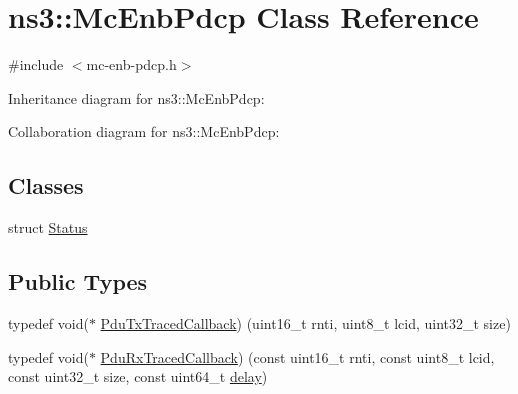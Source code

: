 \hypertarget{classns3_1_1McEnbPdcp}{}\section{ns3\+:\+:Mc\+Enb\+Pdcp Class Reference}
\label{classns3_1_1McEnbPdcp}


{\ttfamily \#include $<$mc-\/enb-\/pdcp.\+h$>$}



Inheritance diagram for ns3\+:\+:Mc\+Enb\+Pdcp\+:


Collaboration diagram for ns3\+:\+:Mc\+Enb\+Pdcp\+:
\subsection*{Classes}
\begin{DoxyCompactItemize}
\item 
struct \hyperlink{structns3_1_1McEnbPdcp_1_1Status}{Status}
\end{DoxyCompactItemize}
\subsection*{Public Types}
\begin{DoxyCompactItemize}
\item 
typedef void($\ast$ \hyperlink{classns3_1_1McEnbPdcp_ae630cc934391b89c81dd4dc5a53a11cb}{Pdu\+Tx\+Traced\+Callback}) (uint16\+\_\+t rnti, uint8\+\_\+t lcid, uint32\+\_\+t size)
\item 
typedef void($\ast$ \hyperlink{classns3_1_1McEnbPdcp_a937b4658abf63512f78d66ceda603ba8}{Pdu\+Rx\+Traced\+Callback}) (const uint16\+\_\+t rnti, const uint8\+\_\+t lcid, const uint32\+\_\+t size, const uint64\+\_\+t \hyperlink{mmwave_2model_2fading-traces_2fading__trace__generator_8m_a7964e6aa8f61a9d28973c8267a606ad8}{delay})
\end{DoxyCompactItemize}
